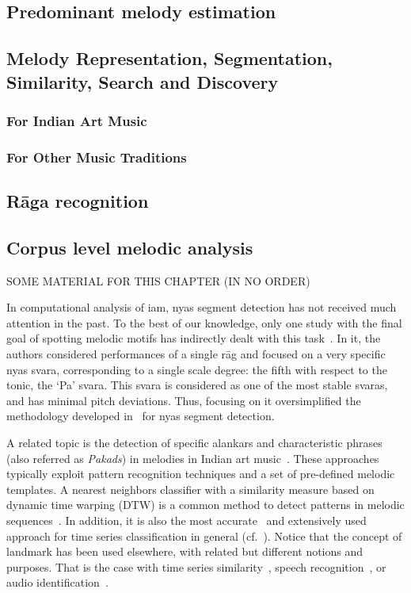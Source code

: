 \subsection{Predominant melody estimation}
\subsection{Melody Representation, Segmentation, Similarity, Search and Discovery}
\subsubsection{For Indian Art Music}
\subsubsection{For Other Music Traditions}
\subsection{R\={a}ga recognition}
\subsection{Corpus level melodic analysis}

SOME MATERIAL FOR THIS CHAPTER (IN NO ORDER)

In computational analysis of \gls{iam}, \gls{nyas} segment detection has not received much attention in the past. To the best of our knowledge, only one study with the final goal of spotting melodic motifs has indirectly dealt with this task~\citep{Ross2012}. In it, the authors considered performances of a single r\={a}g and focused on a very specific \gls{nyas} \gls{svara}, corresponding to a single scale degree: the fifth with respect to the tonic, the `Pa' \gls{svara}. This \gls{svara} is considered as one of the most stable \glspl{svara}, and has minimal pitch deviations. Thus, focusing on it oversimplified the methodology developed in~\cite{Ross2012} for \gls{nyas} segment detection.  

A related topic is the detection of specific \glspl{alankar} and characteristic phrases (also referred as {\it Pakads}) in melodies in Indian art music~\cite{Datta2007, Pratyush2010, Ross2012b, Ishwar2013}. These approaches typically exploit pattern recognition techniques and a set of pre-defined melodic templates. A nearest neighbors classifier with a similarity measure based on dynamic time warping (DTW) is a common method to detect patterns in melodic sequences~\cite{Pratyush2010, Ross2012b}. In addition, it is also the most accurate~\cite{Xi06ICML} and extensively used approach for time series classification in general (cf.~\cite{Wang12DMKD}). Notice that the concept of landmark has been used elsewhere, with related but different notions and purposes. That is the case with time series similarity~\cite{Perng00ICDE}, speech recognition~\cite{Jansen08JASA,Chen12ICASSP}, or audio identification~\cite{Duong13ICASSP}.



